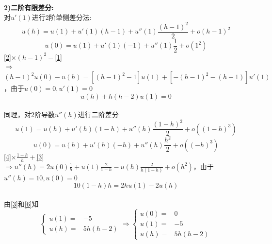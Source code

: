 \documentclass[a4paper,11pt,UTF8]{article}%
\theoremstyle{plain}
\begin{document}
	\indent\textbf{2)二阶有限差分:} \\ 
	对$u'\left(1\right)$进行2阶单侧差分法:\\
	\begin{equation}
		u\left(h\right)=u\left(1\right)+u'\left(1\right)\left(h-1\right)+u''\left(1\right)\frac{\left(h-1\right)^2}{2}+o\left(h-1\right)^2\label{1}
	\end{equation}
	\begin{equation}
		u\left(0\right)=u\left(1\right)+u'\left(1\right)\left(-1\right)+u''\left(1\right)\frac{1}{2}+o\left(1^2\right)\label{2}
	\end{equation}
	\eqref{2}$\times$$\left(h-1\right)^2-$\eqref{1}\\
	$\Rightarrow$$\left(h-1\right)^2u\left(0\right)-u\left(h\right)=\left[\left(h-1\right)^2-1\right]u\left(1\right)+\left[-\left(h-1\right)^2-\left(h-1\right)\right]u'\left(1\right)$，由于$u\left(0\right)=0,u'\left(1\right)=0$\\
		\begin{equation}
			u\left(h\right)+h\left(h-2\right)u\left(1\right)=0\label{3}
	\end{equation}
	~\\
	同理，对2阶导数$u''\left(h\right)$进行二阶差分\\
		\begin{equation}
u\left(1\right)=u\left(h\right)+u'\left(h\right)\left(1-h\right)+u''\left(h\right)\frac{\left(1-h\right)^2}{2}+o\left(\left(1-h\right)^3\right)\label{4}
	\end{equation}
	\begin{equation}
		u\left(0\right)=u\left(h\right)+u'\left(h\right)\left(-h\right)+u''\left(h\right)\frac{h^2}{2}+o\left(\left(-h\right)^3\right)\label{5}
	\end{equation}
	\eqref{4}$\times$$\frac{1-h}{h}+$\eqref{3}\\
	$\Rightarrow$$u''\left(h\right)=2u\left(0\right)\frac{1}{h}+u\left(1\right)\frac{2}{1-h}-u\left(h\right)\frac{2}{h\left(1-h\right)}+o\left(h^2\right)$，由于$u''\left(h\right)=10,u\left(0\right)=0$\\
			\begin{equation}
		10\left(1-h\right)h=2hu\left(1\right)-2u\left(h\right)\label{6}
	\end{equation}\\
	由\eqref{3}和\eqref{6}知\\
	$$\left\{
	\begin{aligned}
		u\left(1\right)=&-5\\
		u\left(h\right)=&5h\left(h-2\right)
	\end{aligned}
	\right.\Rightarrow
	\left\{
	\begin{aligned}
			u\left(0\right)=&0\\
		u\left(1\right)=&-5\\
		u\left(h\right)=&5h\left(h-2\right)
	\end{aligned}
	\right.$$\\
	~\\
	
\end{document}
